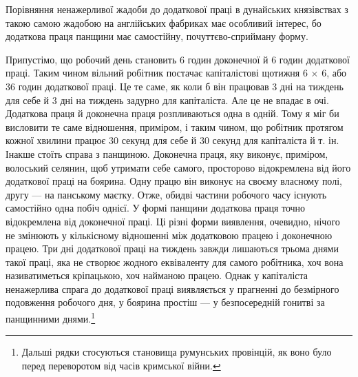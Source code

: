 Порівняння ненажерливої жадоби до додаткової праці в дунайських
князівствах з такою самою жадобою на англійських
фабриках має особливий інтерес, бо додаткова праця панщини
має самостійну, почуттєво-сприйману форму.

Припустімо, що робочий день становить 6 годин доконечної
й 6 годин додаткової праці. Таким чином вільний робітник
постачає капіталістові щотижня 6 × 6, або 36 годин додаткової
праці. Це те саме, як коли б він працював 3 дні на тиждень для
себе й 3 дні на тиждень задурно для капіталіста. Але це не впадає
в очі. Додаткова праця й доконечна праця розпливаються одна
в одній. Тому я міг би висловити те саме відношення, приміром,
і таким чином, що робітник протягом кожної хвилини працює
30 секунд для себе й 30 секунд для капіталіста й т. ін. Інакше
стоїть справа з панщиною. Доконечна праця, яку виконує, приміром,
волоський селянин, щоб утримати себе самого, просторово
відокремлена від його додаткової праці на боярина. Одну працю
він виконує на своєму власному полі, другу — на панському
маєтку. Отже, обидві частини робочого часу існують самостійно
одна побіч однієї. У формі панщини додаткова праця точно відокремлена
від доконечної праці. Ці різні форми виявлення, очевидно,
нічого не змінюють у кількісному відношенні між додатковою
працею і доконечною працею. Три дні додаткової праці на
тиждень завжди лишаються трьома днями такої праці, яка не
створює жодного еквіваленту для самого робітника, хоч вона
називатиметься кріпацькою, хоч найманою працею. Однак у
капіталіста ненажерлива спрага до додаткової праці виявляється
у прагненні до безмірного подовження робочого дня, у боярина
простіш — у безпосередній гонитві за панщинними днями.\footnote{
Дальші рядки стосуються становища румунських провінцій, як
воно було перед переворотом від часів кримської війни.
}


